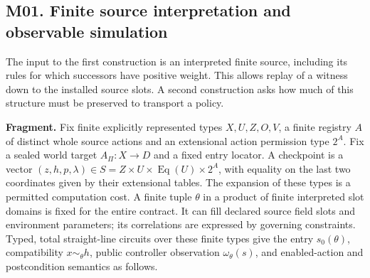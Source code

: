 \subsection{M01. Finite source interpretation and observable simulation}

\label{ext:m01}

The input to the first construction is an interpreted finite source, including its rules for which successors have positive weight. This allows replay of a witness down to the installed source slots. A second construction asks how much of this structure must be preserved to transport a policy.

\begin{theorem}\label{ext:m011}

\textbf{Fragment.} Fix finite explicitly represented types \(X,U,Z,O,V\), a finite registry \(A\) of distinct whole source actions and an extensional action permission type \(2^A\). Fix a sealed world target \(A_\Pi:X\to D\) and a fixed entry locator. A checkpoint is a vector \((z,h,p,\lambda)\in S=Z\times U\times \operatorname{Eq}(U)\times 2^A\), with equality on the last two coordinates given by their extensional tables. The expansion of these types is a permitted computation cost. A finite tuple \(\theta\) in a product of finite interpreted slot domains is fixed for the entire contract. It can fill declared source field slots and environment parameters; its correlations are expressed by governing constraints. Typed, total straight-line circuits over these finite types give the entry \(s_0(\theta)\), compatibility \(x\sim_\theta h\), public controller observation \(\omega_\theta(s)\), and enabled-action and postcondition semantics as follows.

\begin{itemize}


\end{itemize}
\end{theorem}
